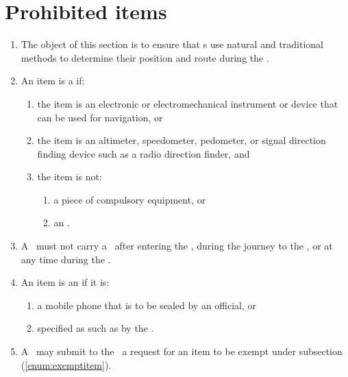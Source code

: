 \documentclass[12pt]{report}
\begin{document}
  \section{Prohibited items}
  \begin{enumerate}
    \item The object of this section is to ensure that \team s use natural and traditional methods to determine their position and route during the \race.
    \item An item is a  if:
    \begin{enumerate}
      \item the item is an electronic or electromechanical instrument or device that can be used for navigation, or
      \item the item is an altimeter, speedometer, pedometer, or signal direction finding device such as a radio direction finder, and
      \item the item is not:
      \begin{enumerate}
      \item a piece of compulsory equipment, or
      \item an \exemptitem.
      \end{enumerate}
    \end{enumerate}
    \item A \team\ must not carry a \prohibiteditem\ after entering the \scrutineeringarea,  during the journey to the \dropoffpoint, or at any time during the \race.

    \item An item is an  if it is:
     \begin{enumerate} \amended
     \item a  mobile phone that is to be sealed by an official, or
     \item specified as such as by the \RaceDirector. \label{enum:exemptitem}
     \end{enumerate}
    \item A \team\ may submit to the \RaceDirector\ a request for an item to be exempt under subsection \thesection(\ref{enum:exemptitem}).
  \end{enumerate}
\end{document}
